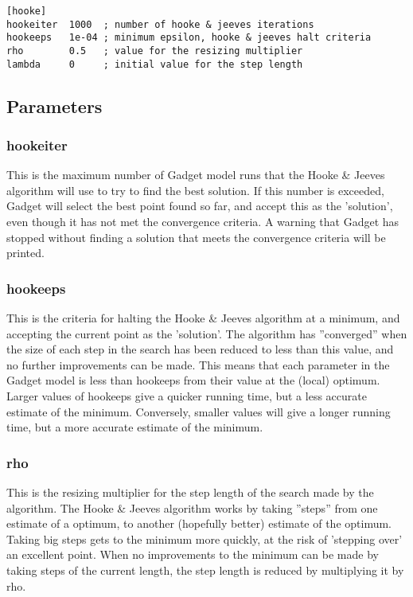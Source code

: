 \documentclass[10pt,twoside]{book}
\begin{document}
{\small\begin{verbatim}
[hooke]
hookeiter  1000  ; number of hooke & jeeves iterations
hookeeps   1e-04 ; minimum epsilon, hooke & jeeves halt criteria
rho        0.5   ; value for the resizing multiplier
lambda     0     ; initial value for the step length
\end{verbatim}}

\subsection{Parameters}\label{subsec:hookepar}
\subsubsection{hookeiter}
This is the maximum number of Gadget model runs that the Hooke \& Jeeves algorithm will use to try to find the best solution.  If this number is exceeded, Gadget will select the best point found so far, and accept this as the 'solution', even though it has not met the convergence criteria.  A warning that Gadget has stopped without finding a solution that meets the convergence criteria will be printed.

\subsubsection{hookeeps}
This is the criteria for halting the Hooke \& Jeeves algorithm at a minimum, and accepting the current point as the 'solution'.  The algorithm has ''converged'' when the size of each step in the search has been reduced to less than this value, and no further improvements can be made.  This means that each parameter in the Gadget model is less than hookeeps from their value at the (local) optimum.  Larger values of hookeeps give a quicker running time, but a less accurate estimate of the minimum.  Conversely, smaller values will give a longer running time, but a more accurate estimate of the minimum.

\subsubsection{rho}
This is the resizing multiplier for the step length of the search made by the algorithm.  The Hooke \& Jeeves algorithm works by taking ''steps'' from one estimate of a optimum, to another (hopefully better) estimate of the optimum.  Taking big steps gets to the minimum more quickly, at the risk of 'stepping over' an excellent point.  When no improvements to the minimum can be made by taking steps of the current length, the step length is reduced by multiplying it by rho.
\end{document}
